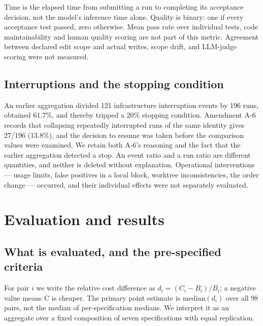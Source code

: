 \documentclass[a4paper,11pt]{article}
\begin{document}
Time is the elapsed time from submitting a run to completing its acceptance decision, not the model's inference time alone. Quality is binary: one if every acceptance test passed, zero otherwise. Mean pass rate over individual tests, code maintainability and human quality scoring are not part of this metric. Agreement between declared edit scope and actual writes, scope drift, and LLM-judge scoring were not measured.

\subsection{Interruptions and the stopping condition}
An earlier aggregation divided 121 infrastructure interruption events by 196 runs, obtained 61.7\%, and thereby tripped a 20\% stopping condition. Amendment A-6 records that collapsing repeatedly interrupted runs of the same identity gives 27/196 (13.8\%), and the decision to resume was taken before the comparison values were examined. We retain both A-6's reasoning and the fact that the earlier aggregation detected a stop. An event ratio and a run ratio are different quantities, and neither is deleted without explanation. Operational interventions --- usage limits, false positives in a local block, worktree inconsistencies, the order change --- occurred, and their individual effects were not separately evaluated.

\section{Evaluation and results}\label{sec:results}
\subsection{What is evaluated, and the pre-specified criteria}
For pair $i$ we write the relative cost difference as $d_i=(C_i-B_i)/B_i$; a negative value means C is cheaper. The primary point estimate is $\mathrm{median}(d_i)$ over all 98 pairs, not the median of per-specification medians. We interpret it as an aggregate over a fixed composition of seven specifications with equal replication.
\end{document}
